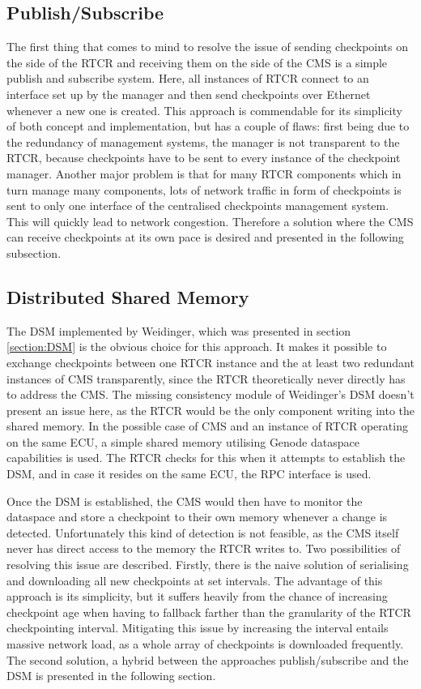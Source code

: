 \subsection{Publish/Subscribe}
The first thing that comes to mind to resolve the issue of sending checkpoints on the side of the RTCR and receiving them on the side of the CMS is a simple publish and subscribe system. Here, all instances of RTCR connect to an interface set up by the manager and then send checkpoints over Ethernet whenever a new one is created. This approach is commendable for its simplicity of both concept and implementation, but has a couple of flaws: first being due to the redundancy of management systems, the manager is not transparent to the RTCR, because checkpoints have to be sent to every instance of the checkpoint manager. Another major problem is that for many RTCR components which in turn manage many components, lots of network traffic in form of checkpoints is sent to only one interface of the centralised checkpoints management system. This will quickly lead to network congestion. Therefore a solution where the CMS can receive checkpoints at its own pace is desired and presented in the following subsection.
\subsection{Distributed Shared Memory}
The DSM implemented by Weidinger, which was presented in section \ref{section:DSM} is the obvious choice for this approach. It makes it possible to exchange checkpoints between one RTCR instance and the at least two redundant instances of CMS transparently, since the RTCR theoretically never directly has to address the CMS. The missing consistency module of Weidinger's DSM doesn't present an issue here, as the RTCR would be the only component writing into the shared memory. In the possible case of CMS and an instance of RTCR operating on the same ECU, a simple shared memory utilising Genode dataspace capabilities is used. The RTCR checks for this when it attempts to establish the DSM, and in case it resides on the same ECU, the RPC interface is used.

Once the DSM is established, the CMS would then have to monitor the dataspace and store a checkpoint to their own memory whenever a change is detected. Unfortunately this kind of detection is not feasible, as the CMS itself never has direct access to the memory the RTCR writes to. Two possibilities of resolving this issue are described. Firstly, there is the naive solution of serialising and downloading all new checkpoints at set intervals. The advantage of this approach is its simplicity, but it suffers heavily from the chance of increasing checkpoint age when having to fallback farther than the granularity of the RTCR checkpointing interval. Mitigating this issue by increasing the interval entails massive network load, as a whole array of checkpoints is downloaded frequently. The second solution, a hybrid between the approaches publish/subscribe and the DSM is presented in the following section.
